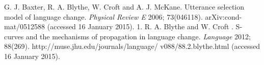 \documentclass[12pt]{article}
\begin{document}
\newpage
\begin{thebibliography}{99}
 	G. J. Baxter, R. A. Blythe, W. Croft and A. J. McKane. Utterance selection model of language change. \emph{Physical Review E} 2006; 73(046118). arXiv:cond-mat/0512588 (accessed 16 January 2015).
 1.	R. A. Blythe and W. Croft . S-curves and the mechanisms of propagation in language change. \emph{Language} 2012; 88(269). http://muse.jhu.edu/journals/language/ v088/88.2.blythe.html (accessed 16 January 2015).
\end{thebibliography}
\end{document}

